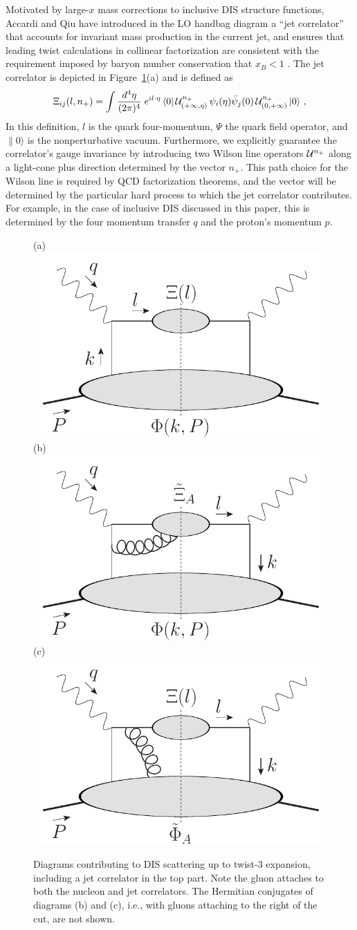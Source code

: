 \documentclass[preprintnumbers,floatfix,nofootinbib]{revtex4}
\newcommand{\de}{d}                    %
\begin{document}
Motivated by large-$x$ mass corrections to inclusive DIS structure functions, Accardi and Qiu have introduced in the LO handbag diagram a ``jet correlator'' that accounts for invariant mass production in the current jet, and ensures that leading twist calculations in collinear factorization are consistent with the requirement imposed by baryon number conservation that $x_B<1$ \cite{Accardi-Qiu}. The jet correlator is depicted in Figure~\ref{fig:handbags}(a) and is defined as
\begin{align} 
\Xi_{ij}(l,n_+) =\int
  \frac{\de^4\eta}{(2\pi)^4}\; e^{i l \cdot \eta}\,
    \langle 0|\, {\cal U}^{n_+}_{(+\infty,\eta)}
\,\psi_i(\eta)
             \bar{\psi}_j(0)\,
{\cal U}^{n_+}_{(0,+\infty)}\,   |0 \rangle \ ,
\label{e:xifull}
\end{align} 
In this definition, $l$ is the quark four-momentum, $\Psi$ the quark field operator, and $\|0\rangle$ is the nonperturbative vacuum. Furthermore, we explicitly guarantee the correlator's gauge invariance by introducing two Wilson line operators ${\cal U}^{n_+}$ along a light-cone plus direction determined by the vector $n_+$. This path choice for the Wilson line is required by QCD factorization theorems, and the vector will be determined by the particular hard process to which the jet correlator contributes. For example, in the case of inclusive DIS discussed in this paper, this is determined by the four momentum transfer $q$ and the proton's momentum $p$.

\begin{figure}
  \centering
  (a)\includegraphics[width=0.3\linewidth,valign=t]{jetdiagram0}
  \hfill
  (b)\includegraphics[width=0.3\linewidth,valign=t]{jetdiagram1}
  \hfill
  (c)\includegraphics[width=0.3\linewidth,valign=t]{jetdiagram2}
  \caption{Diagrams contributing to DIS scattering up to twist-3 expansion, including a jet correlator in the top part. Note the gluon attaches to both the nucleon and jet correlators. The Hermitian conjugates of diagrams (b) and (c), i.e., with gluons attaching to the right of the cut, are not shown.
  }
  \label{fig:handbags}
\end{figure}
\end{document}
